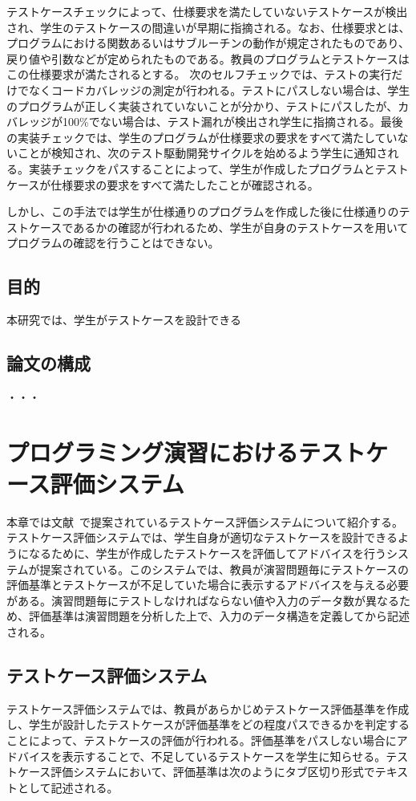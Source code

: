\documentclass{tpu-sotu}
\begin{document}
テストケースチェックによって、仕様要求を満たしていないテストケースが検出され、学生のテストケースの間違いが早期に指摘される。なお、仕様要求とは、プログラムにおける関数あるいはサブルーチンの動作が規定されたものであり、戻り値や引数などが定められたものである。教員のプログラムとテストケースはこの仕様要求が満たされるとする。
次のセルフチェックでは、テストの実行だけでなくコードカバレッジの測定が行われる。テストにパスしない場合は、学生のプログラムが正しく実装されていないことが分かり、テストにパスしたが、カバレッジが100\%でない場合は、テスト漏れが検出され学生に指摘される。最後の実装チェックでは、学生のプログラムが仕様要求の要求をすべて満たしていないことが検知され、次のテスト駆動開発サイクルを始めるよう学生に通知される。実装チェックをパスすることによって、学生が作成したプログラムとテストケースが仕様要求の要求をすべて満たしたことが確認される。

しかし、この手法では学生が仕様通りのプログラムを作成した後に仕様通りのテストケースであるかの確認が行われるため、学生が自身のテストケースを用いてプログラムの確認を行うことはできない。
\section{目的}
本研究では、学生がテストケースを設計できる
\section{論文の構成}
  ・・・
\chapter{プログラミング演習におけるテストケース評価システム}
本章では文献~\cite{a1}で提案されているテストケース評価システムについて紹介する。テストケース評価システムでは、学生自身が適切なテストケースを設計できるようになるために、学生が作成したテストケースを評価してアドバイスを行うシステムが提案されている。このシステムでは、教員が演習問題毎にテストケースの評価基準とテストケースが不足していた場合に表示するアドバイスを与える必要がある。演習問題毎にテストしなければならない値や入力のデータ数が異なるため、評価基準は演習問題を分析した上で、入力のデータ構造を定義してから記述される。
\section{テストケース評価システム}
テストケース評価システムでは、教員があらかじめテストケース評価基準を作成し、学生が設計したテストケースが評価基準をどの程度パスできるかを判定することによって、テストケースの評価が行われる。評価基準をパスしない場合にアドバイスを表示することで、不足しているテストケースを学生に知らせる。テストケース評価システムにおいて、評価基準は次のようにタブ区切り形式でテキストとして記述される。
\end{document}

